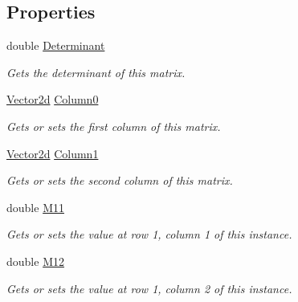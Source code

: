 \subsection*{Properties}
\begin{DoxyCompactItemize}
\item 
double \hyperlink{struct_open_t_k_1_1_matrix2d_a9778b5f32cdac2c35a838327a73ba82c}{Determinant}
\begin{DoxyCompactList}\small\item\em Gets the determinant of this matrix. \end{DoxyCompactList}\item 
\hyperlink{struct_open_t_k_1_1_vector2d}{Vector2d} \hyperlink{struct_open_t_k_1_1_matrix2d_a557683389b82aa5fc6fc935c0ec3279d}{Column0}
\begin{DoxyCompactList}\small\item\em Gets or sets the first column of this matrix. \end{DoxyCompactList}\item 
\hyperlink{struct_open_t_k_1_1_vector2d}{Vector2d} \hyperlink{struct_open_t_k_1_1_matrix2d_a83cbf7e42a8198467fa04832da210260}{Column1}
\begin{DoxyCompactList}\small\item\em Gets or sets the second column of this matrix. \end{DoxyCompactList}\item 
double \hyperlink{struct_open_t_k_1_1_matrix2d_ab41b4dd160bb33fa9912ffad44fe5a79}{M11}
\begin{DoxyCompactList}\small\item\em Gets or sets the value at row 1, column 1 of this instance. \end{DoxyCompactList}\item 
double \hyperlink{struct_open_t_k_1_1_matrix2d_a75f48dca6e7b41c44e1476019e5310b6}{M12}
\begin{DoxyCompactList}\small\item\em Gets or sets the value at row 1, column 2 of this instance. \end{DoxyCompactList}\item 

\end{DoxyCompactItemize}
